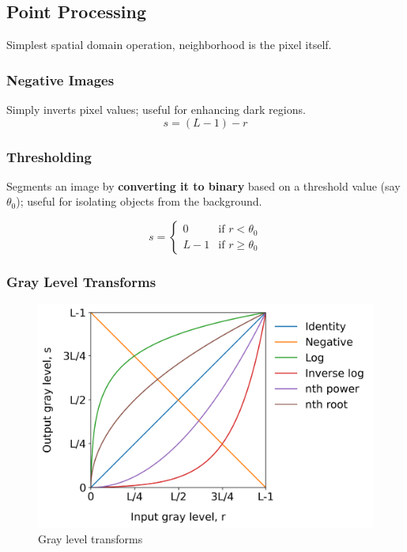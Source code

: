 \subsection*{Point Processing}

Simplest spatial domain operation, neighborhood is the pixel itself.

\subsubsection*{Negative Images}

Simply inverts pixel values; useful for enhancing dark regions.
\begin{equation*}
  s = (L - 1) - r
\end{equation*}

\subsubsection*{Thresholding}

Segments an image by \textbf{converting it to binary} based on a threshold value (say $\theta_0$); useful for isolating objects from the background.

\begin{equation*}
  s = \begin{cases}
    0 & \text{if } r < \theta_0 \\
    L - 1 & \text{if } r \geq \theta_0
  \end{cases}
\end{equation*}

\subsubsection*{Gray Level Transforms}

\begin{figure}[H]
  \centering
  \includegraphics[width=\linewidth]{images/gray_level_transforms.png}
  \caption{Gray level transforms}
\end{figure}

